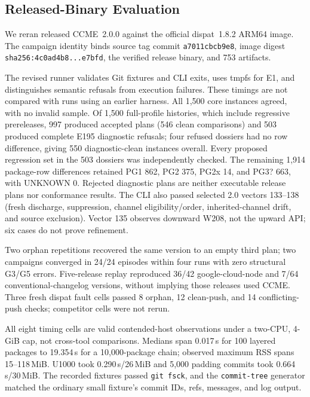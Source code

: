 \documentclass[sigconf,nonacm]{acmart}
\newcommand{\code}[1]{\texttt{#1}}
\begin{document}
\subsection{Released-Binary Evaluation}
\label{sec:eval:fresh}

We reran released CCME~2.0.0 against the official dispat~1.8.2 ARM64 image.
The campaign identity binds source tag commit \code{a7011cbcb9e8}, image digest
\code{sha256:4c0ad4b8...e7bfd}, the verified release binary, and 753 artifacts.

The revised runner validates Git fixtures and CLI exits, uses tmpfs for E1,
and distinguishes semantic refusals from execution failures. These timings
are not compared with runs using an earlier harness. All 1{,}500 core
instances agreed, with no invalid sample. Of 1{,}500 full-profile histories, which include
regressive prereleases, 997 produced accepted plans (546 clean comparisons)
and 503 produced complete E195 diagnostic refusals; four refused dossiers had
no row difference, giving 550 diagnostic-clean instances overall. Every
proposed regression set in the 503 dossiers was independently checked. The
remaining 1{,}914 package-row differences retained PG1 862, PG2 375, PG2x 14,
and PG3? 663, with UNKNOWN 0. Rejected diagnostic plans are neither executable
release plans nor conformance results. The CLI also
passed selected 2.0 vectors 133--138 (fresh discharge, suppression, channel
eligibility/order, inherited-channel drift, and source exclusion). Vector 135
observes downward W208, not the upward API; six cases do not prove refinement.

Two orphan repetitions recovered the same version to an empty third plan;
two campaigns converged in 24/24 episodes within four runs with zero structural
G3/G5 errors. Five-release replay reproduced 36/42 google-cloud-node and 7/64
conventional-changelog versions, without implying those releases used CCME.
Three fresh dispat fault cells passed 8 orphan, 12 clean-push, and 14
conflicting-push checks; competitor cells were not rerun.

All eight timing cells are valid contended-host observations under a two-CPU,
4-GiB cap, not cross-tool comparisons. Medians span 0.017\,s for 100 layered
packages to 19.354\,s for a 10{,}000-package chain; observed maximum RSS spans
15--118\,MiB. U1000 took 0.290\,s/26\,MiB and 5{,}000 padding commits took
0.664\,s/30\,MiB. The recorded fixtures passed \code{git fsck}, and the
\code{commit-tree} generator matched the ordinary small fixture's commit IDs,
refs, messages, and log output.
\end{document}
